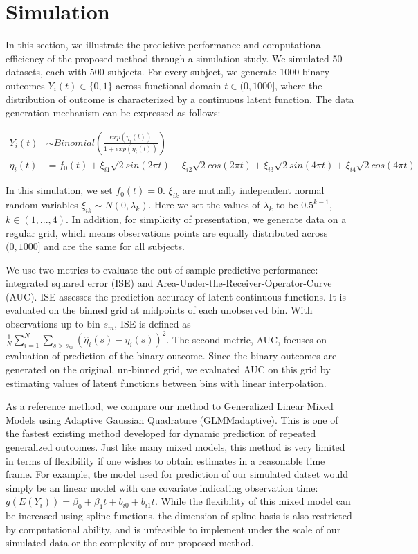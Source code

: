 \documentclass[
  11pt,
]{article}
\begin{document}
\hypertarget{simulation}{%
\section{Simulation}\label{simulation}}

In this section, we illustrate the predictive performance and
computational efficiency of the proposed method through a simulation
study. We simulated 50 datasets, each with 500 subjects. For every
subject, we generate 1000 binary outcomes \(Y_i(t) \in \{0, 1\}\) across
functional domain \(t \in (0, 1000]\), where the distribution of outcome
is characterized by a continuous latent function. The data generation
mechanism can be expressed as follows:

\[\begin{aligned}
Y_i(t) & \sim Binomial(\frac{exp(\eta_i(t))}{1+exp(\eta_i(t))}) \\
\eta_i(t) &= f_0(t)+ \xi_{i1}\sqrt{2}sin(2\pi t)+\xi_{i2}\sqrt{2}cos(2\pi t)+\xi_{i3}\sqrt{2}sin(4\pi t)+\xi_{i4}\sqrt{2}cos(4\pi t)
\end{aligned}\]

In this simulation, we set \(f_0(t) = 0\). \(\xi_{ik}\) are mutually
independent normal random variables \(\xi_{ik}\sim N(0, \lambda_k)\).
Here we set the values of \(\lambda_k\) to be \(0.5^{k-1}\),
\(k \in (1,..., 4)\). In addition, for simplicity of presentation, we
generate data on a regular grid, which means observations points are
equally distributed across \((0, 1000]\) and are the same for all
subjects.

We use two metrics to evaluate the out-of-sample predictive performance:
integrated squared error (ISE) and
Area-Under-the-Receiver-Operator-Curve (AUC). ISE assesses the
prediction accuracy of latent continuous functions. It is evaluated on
the binned grid at midpoints of each unobserved bin. With observations
up to bin \(s_m\), ISE is defined as
\(\frac{1}{N}\sum_{i=1}^N\sum_{s>s_m} (\hat{\eta}_i(s)-\eta_i(s))^2\).
The second metric, AUC, focuses on evaluation of prediction of the
binary outcome. Since the binary outcomes are generated on the original,
un-binned grid, we evaluated AUC on this grid by estimating values of
latent functions between bins with linear interpolation.

As a reference method, we compare our method to Generalized Linear Mixed
Models using Adaptive Gaussian Quadrature (GLMMadaptive). This is one of
the fastest existing method developed for dynamic prediction of repeated
generalized outcomes. Just like many mixed models, this method is very
limited in terms of flexibility if one wishes to obtain estimates in a
reasonable time frame. For example, the model used for prediction of our
simulated datset would simply be an linear model with one covariate
indicating observation time:
\(g(E(Y_i)) = \beta_0+\beta_1t+b_{i0}+b_{i1}t\). While the flexibility
of this mixed model can be increased using spline functions, the
dimension of spline basis is also restricted by computational ability,
and is unfeasible to implement under the scale of our simulated data or
the complexity of our proposed method.
\end{document}
